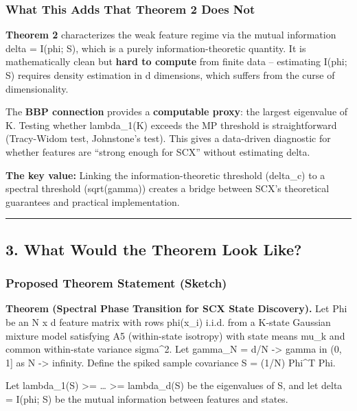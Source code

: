 \documentclass[
  12pt,
]{article}
\begin{document}
\subsubsection{What This Adds That Theorem 2 Does
Not}\label{what-this-adds-that-theorem-2-does-not}

\textbf{Theorem 2} characterizes the weak feature regime via the mutual
information delta = I(phi; S), which is a purely information-theoretic
quantity. It is mathematically clean but \textbf{hard to compute} from
finite data -- estimating I(phi; S) requires density estimation in d
dimensions, which suffers from the curse of dimensionality.

The \textbf{BBP connection} provides a \textbf{computable proxy}: the
largest eigenvalue of K. Testing whether lambda\_1(K) exceeds the MP
threshold is straightforward (Tracy-Widom test, Johnstone's test). This
gives a data-driven diagnostic for whether features are ``strong enough
for SCX'' without estimating delta.

\textbf{The key value:} Linking the information-theoretic threshold
(delta\_c) to a spectral threshold (sqrt(gamma)) creates a bridge
between SCX's theoretical guarantees and practical implementation.

\begin{center}\rule{0.5\linewidth}{0.5pt}\end{center}

\subsection{3. What Would the Theorem Look
Like?}\label{what-would-the-theorem-look-like}

\subsubsection{Proposed Theorem Statement
(Sketch)}\label{proposed-theorem-statement-sketch}

\textbf{Theorem (Spectral Phase Transition for SCX State Discovery).}
Let Phi be an N x d feature matrix with rows phi(x\_i) i.i.d. from a
K-state Gaussian mixture model satisfying A5 (within-state isotropy)
with state means mu\_k and common within-state variance sigma\^{}2. Let
gamma\_N = d/N -\textgreater{} gamma in (0, 1{]} as N -\textgreater{}
infinity. Define the spiked sample covariance S = (1/N) Phi\^{}T Phi.

Let lambda\_1(S) \textgreater= \ldots{} \textgreater= lambda\_d(S) be
the eigenvalues of S, and let delta = I(phi; S) be the mutual
information between features and states.
\end{document}
